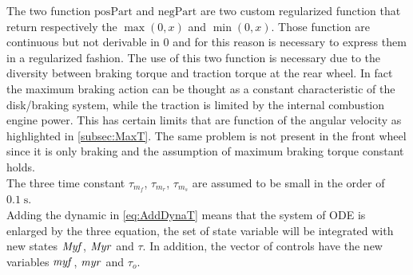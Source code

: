 The two function $\mathrm{posPart}$ and $\mathrm{negPart}$ are two custom regularized function that return respectively the ${\max}(0,x)$ and ${\min}(0,x)$. Those function are continuous but not derivable in $0$ and for this reason is necessary to express them in a regularized fashion. 
The use of this two function is necessary due to the diversity between braking torque and traction torque at the rear wheel. In fact the maximum braking action can be thought as a constant characteristic of the disk/braking system, while the traction is limited by the internal combustion engine power. This has certain limits that are function of the angular velocity as highlighted in \ref{subsec:MaxT}. The same problem is not present in the front wheel since it is only braking and the assumption of maximum braking torque constant holds.\\
The three time constant $\tau_{m_f}$, $\tau_{m_r}$, $\tau_{m_s}$ are assumed to be small in the order of $0.1 \; \si{\second}$.\\
Adding the dynamic in \ref{eq:AddDynaT} means that the system of ODE is enlarged by the three equation, the set of state variable will be integrated with new states $\it Myf$, $\it Myr$ and $\tau$. In addition, the vector of controls have the new variables ${\it myf}$, ${\it myr}$ and $\tau_o$.
%
